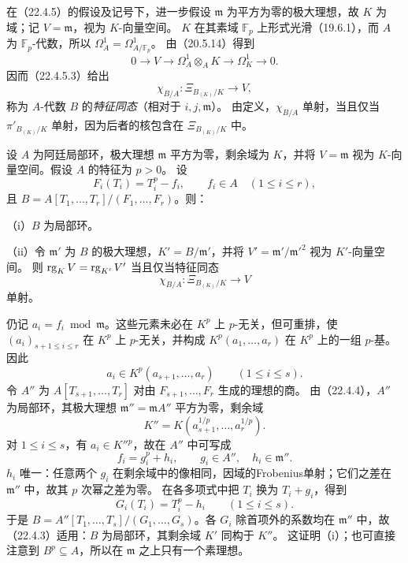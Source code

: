 在（22.4.5）的假设及记号下，进一步假设 $\mathfrak m$ 为平方为零的极大理想，故 $K$ 为域；记 $V=\mathfrak m$，视为 $K$-向量空间。
$K$ 在其素域 $\mathbb F_p$ 上形式光滑（19.6.1），而 $A$ 为 $\mathbb F_p$-代数，所以 $\Omega^1_A=\Omega^1_{A/\mathbb F_p}$。
由（20.5.14）得到
\begin{equation}
 0\longrightarrow V\longrightarrow\Omega^1_A\otimes_AK
 \longrightarrow\Omega^1_K\longrightarrow0.
 \tag{22.4.6.1}
\end{equation}
因而（22.4.5.3）给出
\begin{equation}
 \chi_{B/A}:\Xi_{B_{(K)}/K}\longrightarrow V,
 \tag{22.4.6.2}
\end{equation}
称为 $A$-代数 $B$ 的\emph{特征同态}（相对于 $i,j,\mathfrak m$）。
由定义，$\chi_{B/A}$ 单射，当且仅当 $\pi'_{B_{(K)}/K}$ 单射，因为后者的核包含在 $\Xi_{B_{(K)}/K}$ 中。

设 $A$ 为阿廷局部环，极大理想 $\mathfrak m$ 平方为零，剩余域为 $K$，并将 $V=\mathfrak m$ 视为 $K$-向量空间。假设 $A$ 的特征为 $p>0$。
设
\begin{equation}
 F_i(T_i)=T_i^p-f_i,\qquad f_i\in A\quad(1\le i\le r),
 \tag{22.4.7.1}
\end{equation}
且 $B=A[T_1,\ldots,T_r]/(F_1,\ldots,F_r)$。则：

\noindent（i）$B$ 为局部环。

\noindent（ii）令 $\mathfrak m'$ 为 $B$ 的极大理想，$K'=B/\mathfrak m'$，并将 $V'=\mathfrak m'/\mathfrak m'^2$ 视为 $K'$-向量空间。
则 $\operatorname{rg}_KV=\operatorname{rg}_{K'}V'$ 当且仅当特征同态
\begin{equation}
 \chi_{B/A}:\Xi_{B_{(K)}/K}\longrightarrow V
 \tag{22.4.7.2}
\end{equation}
单射。

\eproof
仍记 $a_i=f_i\bmod\mathfrak m$。这些元素未必在 $K^p$ 上 $p$-无关，但可重排，使
$(a_i)_{s+1\le i\le r}$ 在 $K^p$ 上 $p$-无关，并构成 $K^p(a_1,\ldots,a_r)$ 在 $K^p$ 上的一组 $p$-基。因此
\[
 a_i\in K^p(a_{s+1},\ldots,a_r)\qquad(1\le i\le s).
\]
令 $A''$ 为 $A[T_{s+1},\ldots,T_r]$ 对由 $F_{s+1},\ldots,F_r$ 生成的理想的商。
由（22.4.4），$A''$ 为局部环，其极大理想 $\mathfrak m''=\mathfrak mA''$ 平方为零，剩余域
\[
 K''=K(a_{s+1}^{1/p},\ldots,a_r^{1/p}).
\]
对 $1\le i\le s$，有 $a_i\in K''{}^p$，故在 $A''$ 中可写成
\begin{equation}
 f_i=g_i^p+h_i,\qquad g_i\in A'',\quad h_i\in\mathfrak m''.
 \tag{22.4.7.3}
\end{equation}
$h_i$ 唯一：任意两个 $g_i$ 在剩余域中的像相同，因域的Frobenius单射；它们之差在 $\mathfrak m''$ 中，故其 $p$ 次幂之差为零。
在各多项式中把 $T_i$ 换为 $T_i+g_i$，得到
\[
 G_i(T_i)=T_i^p-h_i\qquad(1\le i\le s).
\]
于是 $B=A''[T_1,\ldots,T_s]/(G_1,\ldots,G_s)$。各 $G_i$ 除首项外的系数均在 $\mathfrak m''$ 中，故（22.4.3）适用：$B$ 为局部环，其剩余域 $K'$ 同构于 $K''$。
这证明（i）；也可直接注意到 $B^p\subseteq A$，所以在 $\mathfrak m$ 之上只有一个素理想。

